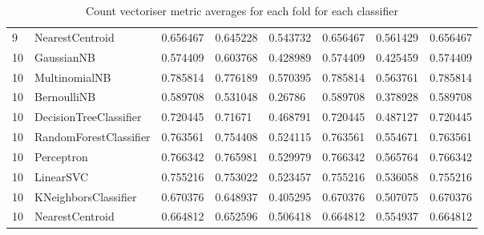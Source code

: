 \documentclass{article}
\begin{document}
\begin{table}[h]
\begin{tabular}{llllllll}
9             & NearestCentroid        & 0.656467          & 0.645228          & 0.543732              & 0.656467              & 0.561429                 & 0.656467                 \\
10            & GaussianNB             & 0.574409          & 0.603768          & 0.428989              & 0.574409              & 0.425459                 & 0.574409                 \\
10            & MultinomialNB          & 0.785814          & 0.776189          & 0.570395              & 0.785814              & 0.563761                 & 0.785814                 \\
10            & BernoulliNB            & 0.589708          & 0.531048          & 0.26786               & 0.589708              & 0.378928                 & 0.589708                 \\
10            & DecisionTreeClassifier & 0.720445          & 0.71671           & 0.468791              & 0.720445              & 0.487127                 & 0.720445                 \\
10            & RandomForestClassifier & 0.763561          & 0.754408          & 0.524115              & 0.763561              & 0.554671                 & 0.763561                 \\
10            & Perceptron             & 0.766342          & 0.765981          & 0.529979              & 0.766342              & 0.565764                 & 0.766342                 \\
10            & LinearSVC              & 0.755216          & 0.753022          & 0.523457              & 0.755216              & 0.536058                 & 0.755216                 \\
10            & KNeighborsClassifier   & 0.670376          & 0.648937          & 0.405295              & 0.670376              & 0.507075                 & 0.670376                 \\
10            & NearestCentroid        & 0.664812          & 0.652596          & 0.506418              & 0.664812              & 0.554937                 & 0.664812                
\end{tabular}
\caption{Count vectoriser metric averages for each fold for each classifier}
\end{table}
\end{document}
